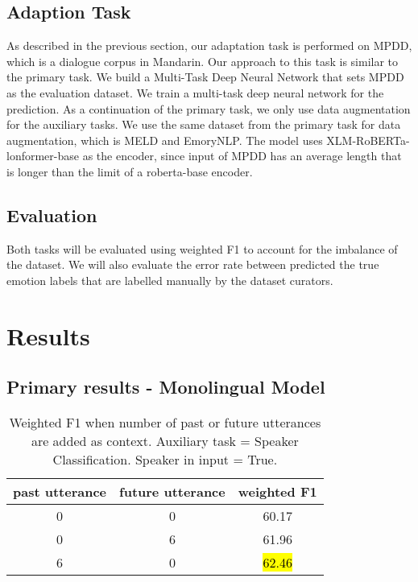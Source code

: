 \documentclass[11pt]{article}
\begin{document}
\subsection{Adaption Task}
As described in the previous section, our adaptation task is performed on MPDD, which is a dialogue corpus in Mandarin. Our approach to this task is similar to the primary task. We build a Multi-Task Deep Neural Network that sets MPDD as the evaluation dataset. We train a multi-task deep neural network for the prediction. As a continuation of the primary task, we only use data augmentation for the auxiliary tasks. We use the same dataset from the primary task for data augmentation, which is MELD and EmoryNLP. The model uses XLM-RoBERTa-lonformer-base as the encoder, since input of MPDD has an average length that is longer than the limit of a roberta-base encoder.
\subsection{Evaluation}

Both tasks will be evaluated using weighted F1 to account for the imbalance of the dataset. We will also evaluate the error rate between predicted the true emotion labels that are labelled manually by the dataset curators. 


\section{Results}
\subsection{Primary results - Monolingual Model}
\label{sec:results}

\begin{table}[hbt]
  \centering
  \begin{tabular}{c|c|c}
    past utterance & future utterance & weighted F1 \\
    \hline
    0 & 0 & 60.17 \\
    \hline
    0 & 6 & 61.96 \\
    \hline
    6 & 0 & \hl{62.46} \\
  \end{tabular}
  \caption{Weighted F1 when number of past or future utterances are added as context. Auxiliary task = Speaker Classification. Speaker in input = True.}
\end{table}
\end{document}
